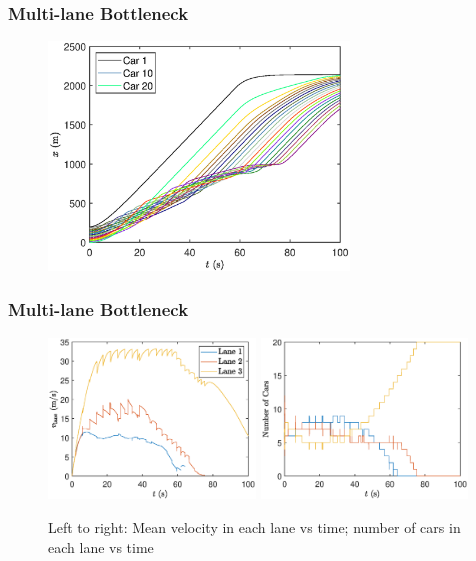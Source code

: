 \documentclass{beamer}
\begin{document}
\begin{frame}
  \frametitle{Multi-lane Bottleneck}
  \begin{figure}[H]
    \includegraphics[width=8cm]{mlbn_x.eps}
\end{figure}
\end{frame}

\begin{frame}
  \frametitle{Multi-lane Bottleneck}
  \begin{figure}[H]
    \includegraphics[width=5.5cm]{mlbn_laneSpeed.eps}
    \includegraphics[width=5.5cm]{mlbn_lanecars.eps}
    \caption{Left to right: Mean velocity in each lane vs time; number of cars in each lane vs time}
\end{figure}
\end{frame}
\end{document}
